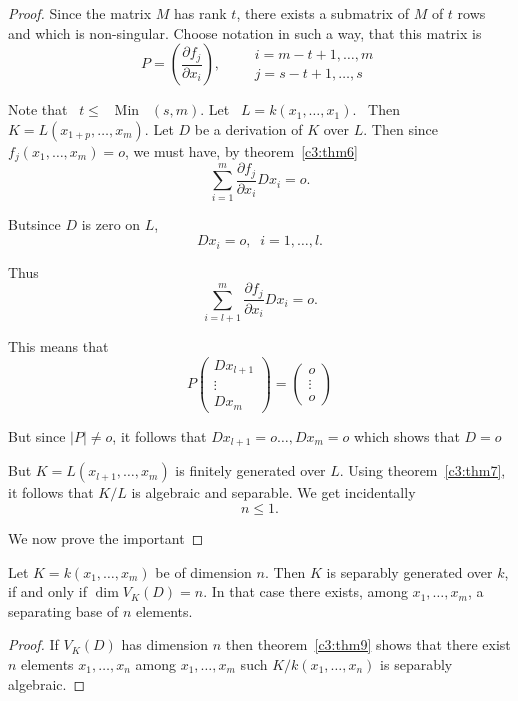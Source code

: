 \begin{proof}
Since the matrix $M$ has rank $t$, there exists a submatrix of $M$ of
$t$ rows and which is non-singular. Choose notation in such a way,
that this matrix is  
$$
P=\left(\frac{\partial f_j}{\partial x_i} \right),
\qquad 
\begin{matrix}
i=m-t+1, \ldots,m\\[5pt]
j=s-t+1, \ldots,s
\end{matrix}
$$

Note that \, $t \leq $ \, Min \, $(s,m)$. Let \, $L= k(x_1, \ldots,
x_1)$. \, Then\\
 $K= L(x_{1+p}, \ldots, x_m)$. Let $D$ be a derivation of $K$ over
$L$. Then since $f_j(x_1, \ldots, x_m) = o$, we must have, by
theorem~\ref{c3:thm6} 
$$
\sum^{m}_{i=1} \frac{\partial f_j}{\partial x_i} Dx_i =o.
$$

But\pageoriginale since $D$ is zero on $L$,
$$
Dx_i=o, \;\; i=1, \ldots, l.
$$

Thus
$$
\sum^{m}_{i=l+1} \frac{\partial f_j}{\partial x_i} Dx_i =o. 
$$

This means that 
\begin{equation*}
P
\begin{pmatrix}
Dx_{l+1}\\
\vdots\\
Dx_m
\end{pmatrix}
=
\begin{pmatrix}
o\\
\vdots\\
o
\end{pmatrix}
\end{equation*}

But since $|P| \neq o$, it follows that $Dx_{l+1} =o \ldots, Dx_m=o$
which shows that $D=o$ 

But $K=L(x_{l+1}, \ldots, x_m)$ is finitely generated over $L$. Using
theorem~\ref{c3:thm7}, it follows that $K/L$ is algebraic and
separable. We get incidentally  
$$
n \leq 1.
$$

We now prove the important 
\end{proof}

\begin{thm}\label{c3:thm10}%
 Let $K=k(x_1, \ldots, x_m)$ be of dimension $n$. Then $K$ is
  separably generated over $k$, if and only if $\dim V_K(D)=n$. In
  that case there exists, among $x_1, \ldots, x_m$, a separating base
  of $n$ elements. 
\end{thm}

\begin{proof}
If $V_K(D)$ has dimension $n$ then theorem~\ref{c3:thm9} shows that
there exist $n$ elements $x_1, \ldots, x_n$ among $x_1, \ldots, x_m$
such $K/k(x_1, \ldots, x_n)$ is separably algebraic.  
\end{proof}

